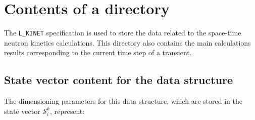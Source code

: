 \section{Contents of a  directory}\label{sect:kinetdir}

The {\tt L\_KINET} specification is used to store the data related to the space-time
neutron kinetics calculations. This directory also contains the main calculations results corresponding
to the current time step of a transient.

\subsection{State vector content for the  data structure}\label{sect:kinetstate}

The dimensioning parameters for this data structure, which are stored in the state vector
$\mathcal{S}^{k}_{i}$, represent:

